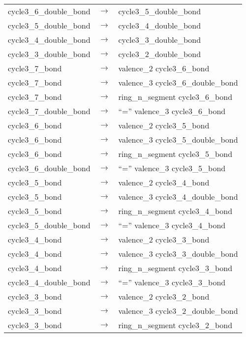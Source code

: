 \begin{longtable}{m{} p{} p{}}
    cycle3\_6\_double\_bond & $\rightarrow$ & cycle3\_5\_double\_bond \\
    cycle3\_5\_double\_bond & $\rightarrow$ & cycle3\_4\_double\_bond \\
    cycle3\_4\_double\_bond & $\rightarrow$ & cycle3\_3\_double\_bond \\
    cycle3\_3\_double\_bond & $\rightarrow$ & cycle3\_2\_double\_bond \\
    cycle3\_7\_bond & $\rightarrow$ & valence\_2 cycle3\_6\_bond \\
    cycle3\_7\_bond & $\rightarrow$ & valence\_3 cycle3\_6\_double\_bond \\
    cycle3\_7\_bond & $\rightarrow$ & ring\_n\_segment cycle3\_6\_bond \\
    cycle3\_7\_double\_bond & $\rightarrow$ & ``='' valence\_3 cycle3\_6\_bond \\
    cycle3\_6\_bond & $\rightarrow$ & valence\_2 cycle3\_5\_bond \\
    cycle3\_6\_bond & $\rightarrow$ & valence\_3 cycle3\_5\_double\_bond \\
    cycle3\_6\_bond & $\rightarrow$ & ring\_n\_segment cycle3\_5\_bond \\
    cycle3\_6\_double\_bond & $\rightarrow$ & ``='' valence\_3 cycle3\_5\_bond \\
    cycle3\_5\_bond & $\rightarrow$ & valence\_2 cycle3\_4\_bond \\
    cycle3\_5\_bond & $\rightarrow$ & valence\_3 cycle3\_4\_double\_bond \\
    cycle3\_5\_bond & $\rightarrow$ & ring\_n\_segment cycle3\_4\_bond \\
    cycle3\_5\_double\_bond & $\rightarrow$ & ``='' valence\_3 cycle3\_4\_bond \\
    cycle3\_4\_bond & $\rightarrow$ & valence\_2 cycle3\_3\_bond \\
    cycle3\_4\_bond & $\rightarrow$ & valence\_3 cycle3\_3\_double\_bond \\
    cycle3\_4\_bond & $\rightarrow$ & ring\_n\_segment cycle3\_3\_bond \\
    cycle3\_4\_double\_bond & $\rightarrow$ & ``='' valence\_3 cycle3\_3\_bond \\
    cycle3\_3\_bond & $\rightarrow$ & valence\_2 cycle3\_2\_bond \\
    cycle3\_3\_bond & $\rightarrow$ & valence\_3 cycle3\_2\_double\_bond \\
    cycle3\_3\_bond & $\rightarrow$ & ring\_n\_segment cycle3\_2\_bond \\

\end{longtable}

